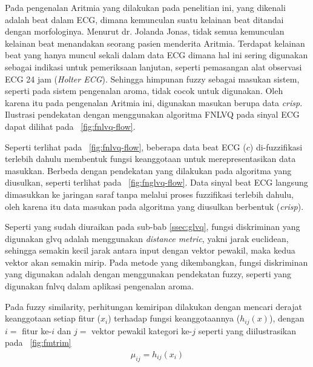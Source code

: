 
Pada pengenalan Aritmia yang dilakukan pada penelitian ini, yang dikenali
adalah beat dalam ECG, dimana kemunculan suatu kelainan beat ditandai dengan
morfologinya. Menurut dr. Jolanda Jonas, tidak semua kemunculan kelainan beat
menandakan seorang pasien menderita Aritmia. Terdapat kelainan beat yang hanya muncul
sekali dalam data ECG dimana hal ini sering digunakan sebagai indikasi untuk
pemeriksaan lanjutan, seperti pemasangan alat observasi ECG 24 jam
(\emph{Holter ECG}). Sehingga himpunan fuzzy sebagai masukan
sistem, seperti pada sistem pengenalan aroma, tidak cocok untuk digunakan. Oleh
karena itu pada pengenalan Aritmia ini, digunakan masukan berupa data
\emph{crisp}.  Ilustrasi pendekatan dengan menggunakan algoritma FNLVQ pada
sinyal ECG dapat dilihat pada \pic~\ref{fig:fnlvq-flow}. 
 

Seperti terlihat pada \pic~\ref{fig:fnlvq-flow}, beberapa data beat ECG ($c$)
di-fuzzifikasi terlebih dahulu membentuk fungsi keanggotaan untuk
merepresentasikan data masukkan. Berbeda dengan pendekatan yang dilakukan pada
algoritma yang diusulkan, seperti terlihat pada \pic~\ref{fig:fnglvq-flow}. Data
sinyal beat ECG langsung dimasukkan ke jaringan saraf tanpa melalui proses
fuzzifikasi terlebih dahulu, oleh karena itu data masukan pada
algoritma yang diusulkan berbentuk (\emph{crisp}).

 
Seperti yang sudah diuraikan pada sub-bab \ref{ssec:glvq}, fungsi diskriminan
yang digunakan \gls{glvq} adalah menggunakan \emph{distance \gls{metric}}, yakni
jarak euclidean, sehingga semakin kecil jarak antara input dengan vektor
pewakil, maka kedua vektor akan semakin mirip. Pada metode yang dikembangkan,
fungsi diskriminan yang digunakan adalah dengan menggunakan
pendekatan fuzzy, seperti yang digunakan \gls{fnlvq} dalam aplikasi pengenalan
aroma.


Pada fuzzy similarity, perhitungan kemiripan dilakukan dengan mencari derajat
keanggotaan setiap fitur ($x_i$) terhadap fungsi keanggotaannya ($h_{ij}(x)$), 
dengan $i=$ fitur ke-$i$ dan $j=$ vektor pewakil kategori ke-$j$ seperti yang
diilustrasikan pada \pic~\ref{fig:fmtrim}
\begin{align}
	\mu_{ij} = h_{ij}(x_i)
\end{align}

